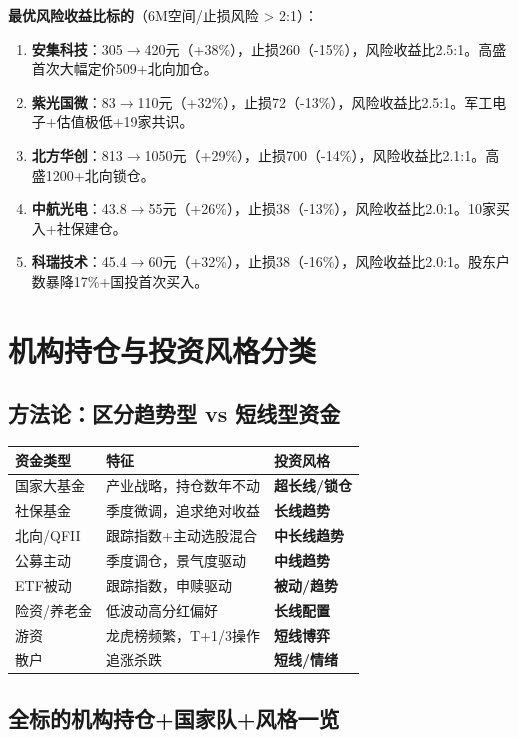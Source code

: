 \documentclass[a4paper,11pt,fontset=none]{ctexart}
\begin{document}
\textbf{最优风险收益比标的}（6M空间/止损风险 > 2:1）：
\begin{enumerate}
  \item \textbf{安集科技}：305$\to$420元（+38\%），止损260（-15\%），风险收益比2.5:1。高盛首次大幅定价509+北向加仓。
  \item \textbf{紫光国微}：83$\to$110元（+32\%），止损72（-13\%），风险收益比2.5:1。军工电子+估值极低+19家共识。
  \item \textbf{北方华创}：813$\to$1050元（+29\%），止损700（-14\%），风险收益比2.1:1。高盛1200+北向锁仓。
  \item \textbf{中航光电}：43.8$\to$55元（+26\%），止损38（-13\%），风险收益比2.0:1。10家买入+社保建仓。
  \item \textbf{科瑞技术}：45.4$\to$60元（+32\%），止损38（-16\%），风险收益比2.0:1。股东户数暴降17\%+国投首次买入。
\end{enumerate}

\newpage
\section{机构持仓与投资风格分类}

\subsection*{方法论：区分趋势型 vs 短线型资金}

\begin{tabularx}{\textwidth}{L{3cm}L{5cm}X}
\toprule
\textbf{资金类型} & \textbf{特征} & \textbf{投资风格} \\
\midrule
国家大基金 & 产业战略，持仓数年不动 & \textbf{超长线/锁仓} \\
社保基金 & 季度微调，追求绝对收益 & \textbf{长线趋势} \\
北向/QFII & 跟踪指数+主动选股混合 & \textbf{中长线趋势} \\
公募主动 & 季度调仓，景气度驱动 & \textbf{中线趋势} \\
ETF被动 & 跟踪指数，申赎驱动 & \textbf{被动/趋势} \\
险资/养老金 & 低波动高分红偏好 & \textbf{长线配置} \\
游资 & 龙虎榜频繁，T+1/3操作 & \textbf{短线博弈} \\
散户 & 追涨杀跌 & \textbf{短线/情绪} \\
\bottomrule
\end{tabularx}

\subsection*{全标的机构持仓+国家队+风格一览}
\end{document}

